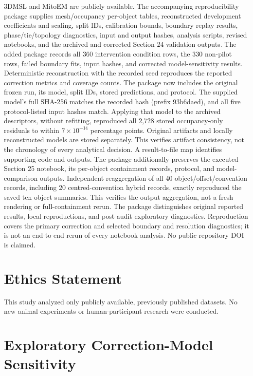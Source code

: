 \documentclass[journal]{IEEEtran}
\begin{document}
3DMSL \cite{ref12} and MitoEM \cite{ref15} are publicly available. The accompanying reproducibility package supplies mesh/occupancy per-object tables, reconstructed development coefficients and scaling, split IDs, calibration bounds, boundary replay results, phase/tie/topology diagnostics, input and output hashes, analysis scripts, revised notebooks, and the archived and corrected Section 24 validation outputs. The added package records all 360 intervention condition rows, the 330 non-pilot rows, failed boundary fits, input hashes, and corrected model-sensitivity results. Deterministic reconstruction with the recorded seed reproduces the reported correction metrics and coverage counts. The package now includes the original frozen run, its model, split IDs, stored predictions, and protocol. The supplied model's full SHA-256 matches the recorded hash (prefix 93b6daed), and all five protocol-listed input hashes match. Applying that model to the archived descriptors, without refitting, reproduced all 2,728 stored occupancy-only residuals to within $7\times10^{-14}$ percentage points. Original artifacts and locally reconstructed models are stored separately. This verifies artifact consistency, not the chronology of every analytical decision. A result-to-file map identifies supporting code and outputs. The package additionally preserves the executed Section 25 notebook, its per-object containment records, protocol, and model-comparison outputs. Independent reaggregation of all 40 object/offset/convention records, including 20 centred-convention hybrid records, exactly reproduced the saved ten-object summaries. This verifies the output aggregation, not a fresh rendering or full-containment rerun. The package distinguishes original reported results, local reproductions, and post-audit exploratory diagnostics. Reproduction covers the primary correction and selected boundary and resolution diagnostics; it is not an end-to-end rerun of every notebook analysis. No public repository DOI is claimed.

\section*{Ethics Statement}

This study analyzed only publicly available, previously published datasets. No new animal experiments or human-participant research were conducted.


\appendices
\section{Exploratory Correction-Model Sensitivity}
\end{document}
